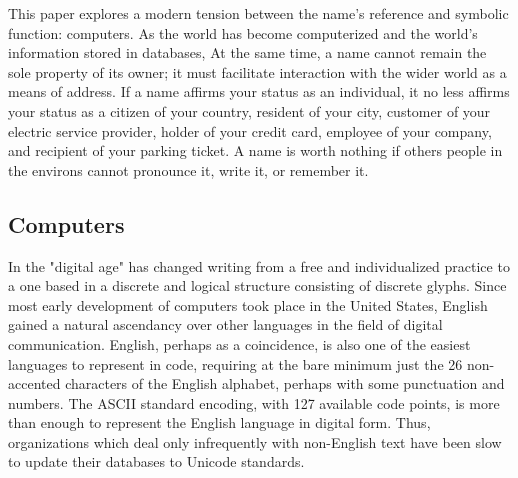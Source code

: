 This paper explores a modern tension between the name's reference and symbolic
function: computers. As the world has become computerized and the world's
information stored in databases, At the same time, a name cannot remain the sole
property of its owner; it must facilitate interaction with the wider
world as a means of address. If a name affirms your status as
an individual, it no less affirms your status as a citizen of your country,
resident of your city, customer of your electric service provider, holder of
your credit card, employee of your company, and recipient of your parking
ticket. A name is worth nothing if others people in the environs cannot
pronounce it, write it, or remember it.

\subsection{Computers}

In the "digital age" has changed writing from a free and individualized practice
to a one based in a discrete and logical structure consisting of discrete
glyphs. Since most early development of computers took place in the United
States, English gained a natural ascendancy over other languages in the field of
digital communication. English, perhaps as a coincidence, is also one of the
easiest languages to represent in code, requiring at the bare minimum just the
26 non-accented characters of the English alphabet, perhaps with some
punctuation and numbers. The ASCII standard encoding, with 127 available code
points, is more than enough to represent the English language in digital form.
Thus, organizations which deal only infrequently with non-English text have been
slow to update their databases to Unicode standards.
